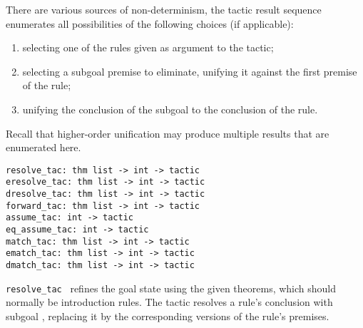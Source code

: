 \begin{isabellebody}
\begin{isamarkuptext}
  There are various sources of non-determinism, the tactic result
  sequence enumerates all possibilities of the following choices (if
  applicable):

  \begin{enumerate}

  \item selecting one of the rules given as argument to the tactic;

  \item selecting a subgoal premise to eliminate, unifying it against
  the first premise of the rule;

  \item unifying the conclusion of the subgoal to the conclusion of
  the rule.

  \end{enumerate}

  Recall that higher-order unification may produce multiple results
  that are enumerated here.%
\end{isamarkuptext}%
\isamarkuptrue%
%
\isadelimmlref
%
\endisadelimmlref
%
\isatagmlref
%
\begin{isamarkuptext}%
\begin{mldecls}
  \verb|resolve_tac: thm list -> int -> tactic| \\
  \verb|eresolve_tac: thm list -> int -> tactic| \\
  \verb|dresolve_tac: thm list -> int -> tactic| \\
  \verb|forward_tac: thm list -> int -> tactic| \\[1ex]
  \verb|assume_tac: int -> tactic| \\
  \verb|eq_assume_tac: int -> tactic| \\[1ex]
  \verb|match_tac: thm list -> int -> tactic| \\
  \verb|ematch_tac: thm list -> int -> tactic| \\
  \verb|dmatch_tac: thm list -> int -> tactic| \\
  \end{mldecls}

  \begin{description}

  \item \verb|resolve_tac|~ refines the goal state
  using the given theorems, which should normally be introduction
  rules.  The tactic resolves a rule's conclusion with subgoal , replacing it by the corresponding versions of the rule's
  premises.


\end{description}
\end{isamarkuptext}
\end{isabellebody}
